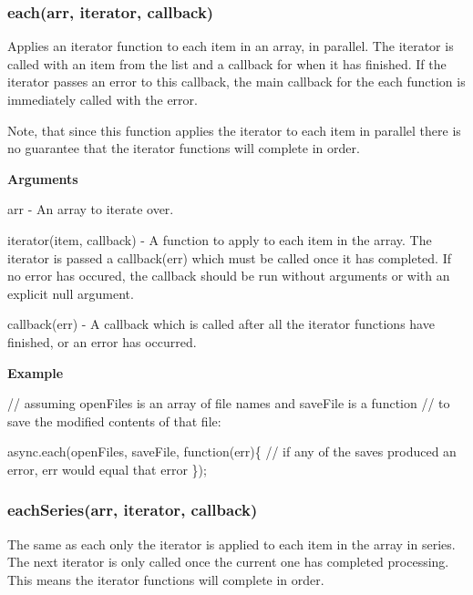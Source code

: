 \label{_forEach}%
 \label{_each}%
 \subsubsection*{each(arr, iterator, callback)}

Applies an iterator function to each item in an array, in parallel. The iterator is called with an item from the list and a callback for when it has finished. If the iterator passes an error to this callback, the main callback for the each function is immediately called with the error.

Note, that since this function applies the iterator to each item in parallel there is no guarantee that the iterator functions will complete in order.

{\bfseries Arguments}


\begin{DoxyItemize}
\item arr -\/ An array to iterate over.
\item iterator(item, callback) -\/ A function to apply to each item in the array. The iterator is passed a callback(err) which must be called once it has completed. If no error has occured, the callback should be run without arguments or with an explicit null argument.
\item callback(err) -\/ A callback which is called after all the iterator functions have finished, or an error has occurred.
\end{DoxyItemize}

{\bfseries Example}


\begin{DoxyCode}
\textcolor{comment}{// assuming openFiles is an array of file names and saveFile is a function}
\textcolor{comment}{// to save the modified contents of that file:}

async.each(openFiles, saveFile, \textcolor{keyword}{function}(err)\{
    \textcolor{comment}{// if any of the saves produced an error, err would equal that error}
\});
\end{DoxyCode}
 



\label{_forEachSeries}%
 \label{_eachSeries}%
 \subsubsection*{each\+Series(arr, iterator, callback)}

The same as each only the iterator is applied to each item in the array in series. The next iterator is only called once the current one has completed processing. This means the iterator functions will complete in order.





